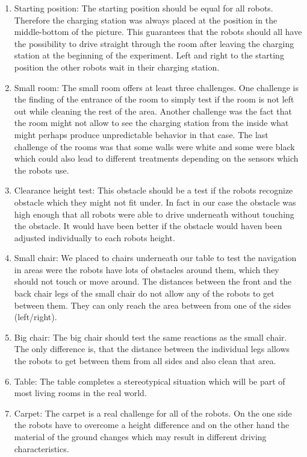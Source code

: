 \documentclass[twoside]{article}
\begin{document}
\begin{enumerate}
\item Starting position: The starting position should be equal for all robots. Therefore the charging station was always placed at the position in the middle-bottom of the picture. This guarantees that the robots should all have the possibility to drive straight through the room after leaving the charging station at the beginning of the experiment. Left and right to the starting position the other robots wait in their charging station.
\item Small room: The small room offers at least three challenges. One challenge is the finding of the entrance of the room to simply test if the room is not left out while cleaning the rest of the area. Another challenge was the fact that the room might not allow to see the charging station from the inside what might perhaps produce unpredictable behavior in that case. The last challenge of the rooms was that some walls were white and some were black which could also lead to different treatments depending on the sensors which the robots use. 
\item Clearance height test: This obstacle should be a test if the robots recognize obstacle which they might not fit under. In fact in our case the obstacle was high enough that all robots were able to drive underneath without touching the obstacle. It would have been better if the obstacle would haven been adjusted individually to each robots height.
\item Small chair: We placed to chairs underneath our table to test the navigation in areas were the robots have lots of obstacles around them, which they should not touch or move around. The distances between the front and the back chair legs of the small chair do not allow any of the robots to get between them. They can only reach the area between from one of the sides (left/right).
\item Big chair: The big chair should test the same reactions as the small chair. The only difference is, that the distance between the individual legs allows the robots to get between them from all sides and also clean that area. 
\item Table: The table completes a stereotypical situation which will be part of most living rooms in the real world.
\item Carpet: The carpet is a real challenge for all of the robots. On the one side the robots have to overcome a height difference and on the other hand the material of the ground changes which may result in different driving characteristics. 

\end{enumerate}
\end{document}
